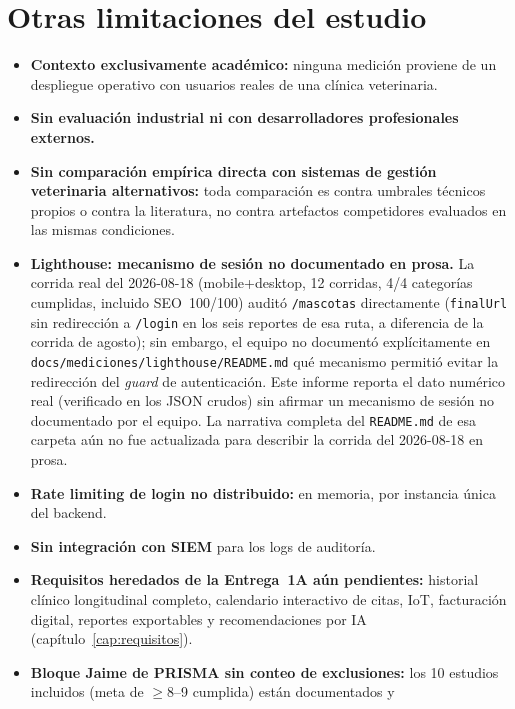 \section{Otras limitaciones del estudio}

\begin{itemize}[nosep]
  \item \textbf{Contexto exclusivamente acad\'emico:} ninguna medici\'on
    proviene de un despliegue operativo con usuarios reales de una
    cl\'inica veterinaria.
  \item \textbf{Sin evaluaci\'on industrial ni con desarrolladores
    profesionales externos.}
  \item \textbf{Sin comparaci\'on emp\'irica directa con sistemas de
    gesti\'on veterinaria alternativos:} toda comparaci\'on es contra
    umbrales t\'ecnicos propios o contra la literatura, no contra artefactos
    competidores evaluados en las mismas condiciones.
  \item \textbf{Lighthouse: mecanismo de sesi\'on no documentado en
    prosa.} La corrida real del 2026-08-18 (mobile+desktop, 12 corridas,
    4/4 categor\'ias cumplidas, incluido SEO~100/100) audit\'o
    \texttt{/mascotas} directamente (\texttt{finalUrl} sin redirecci\'on a
    \texttt{/login} en los seis reportes de esa ruta, a diferencia de la
    corrida de agosto); sin embargo, el equipo no document\'o
    expl\'icitamente en \texttt{docs/mediciones/lighthouse/README.md} qu\'e
    mecanismo permiti\'o evitar la redirecci\'on del \emph{guard} de
    autenticaci\'on. Este informe reporta el dato num\'erico real
    (verificado en los JSON crudos) sin afirmar un mecanismo de sesi\'on no
    documentado por el equipo. La narrativa completa del
    \texttt{README.md} de esa carpeta a\'un no fue actualizada para
    describir la corrida del 2026-08-18 en prosa.
  \item \textbf{Rate limiting de login no distribuido:} en memoria, por
    instancia \'unica del backend.
  \item \textbf{Sin integraci\'on con SIEM} para los logs de auditor\'ia.
  \item \textbf{Requisitos heredados de la Entrega~1A a\'un pendientes:}
    historial cl\'inico longitudinal completo, calendario interactivo de
    citas, IoT, facturaci\'on digital, reportes exportables y
    recomendaciones por IA (cap\'itulo~\ref{cap:requisitos}).
  \item \textbf{Bloque Jaime de PRISMA sin conteo de exclusiones:} los 10
    estudios incluidos (meta de $\geq$8--9 cumplida) est\'an documentados y

\end{itemize}
